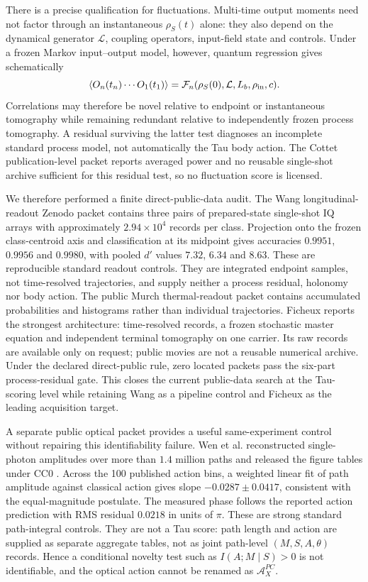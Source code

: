 There is a precise qualification for fluctuations. Multi-time output moments
need not factor through an instantaneous $\rho_S(t)$ alone: they also depend
on the dynamical generator $\mathcal L$, coupling operators, input-field state
and controls. Under a frozen Markov input--output model, however, quantum
regression gives schematically
\begin{equation}
 \langle O_n(t_n)\cdots O_1(t_1)\rangle
 =\mathcal F_n(\rho_S(0),\mathcal L,L_b,\rho_{\rm in},c).
 \label{eq:cottet-correlation-factorization}
\end{equation}
Correlations may therefore be novel relative to endpoint or instantaneous
tomography while remaining redundant relative to independently frozen process
tomography. A residual surviving the latter test diagnoses an incomplete
standard process model, not automatically the Tau body action. The Cottet
publication-level packet reports averaged power and no reusable single-shot
archive sufficient for this residual test, so no fluctuation score is licensed.

We therefore performed a finite direct-public-data audit. The Wang
longitudinal-readout Zenodo packet contains three pairs of prepared-state
single-shot IQ arrays with approximately $2.94\times10^4$ records per class.
Projection onto the frozen class-centroid axis and classification at its
midpoint gives accuracies $0.9951$, $0.9956$ and $0.9980$, with pooled $d'$
values $7.32$, $6.34$ and $8.63$. These are reproducible standard readout
controls. They are integrated endpoint samples, not time-resolved trajectories,
and supply neither a process residual, holonomy nor body action. The public
Murch thermal-readout packet contains accumulated probabilities and histograms
rather than individual trajectories. Ficheux reports the strongest
architecture: time-resolved records, a frozen stochastic master equation and
independent terminal tomography on one carrier. Its raw records are available
only on request; public movies are not a reusable numerical archive. Under the
declared direct-public rule, zero located packets pass the six-part
process-residual gate. This closes the current public-data search at the
Tau-scoring level while retaining Wang as a pipeline control and Ficheux as the
leading acquisition target.

A separate public optical packet provides a useful same-experiment control
without repairing this identifiability failure. Wen et al. reconstructed
single-photon amplitudes over more than $1.4$ million paths and released the
figure tables under CC0 \citep{Wen2026PathData}. Across the 100 published
action bins, a weighted linear fit of path amplitude against classical action
gives slope $-0.0287\pm0.0417$, consistent with the equal-magnitude postulate.
The measured phase follows the reported action prediction with RMS residual
$0.0218$ in units of $\pi$. These are strong standard path-integral controls.
They are not a Tau score: path length and action are supplied as separate
aggregate tables, not as joint path-level $(M,S,A,\theta)$ records. Hence a
conditional novelty test such as $I(A;M\mid S)>0$ is not identifiable, and the
optical action cannot be renamed as $\mathcal A_X^{PC}$.

